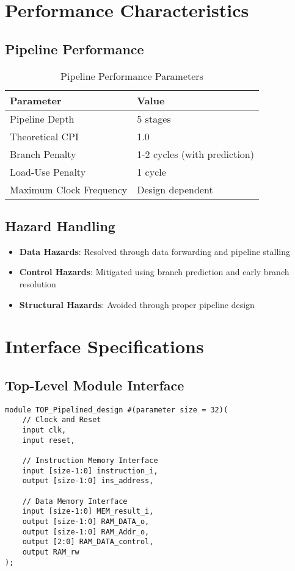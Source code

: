 \documentclass[11pt,a4paper]{article}
\begin{document}
\section{Performance Characteristics}

\subsection{Pipeline Performance}
\begin{table}[h]
\centering
\begin{tabular}{|l|l|}
\hline
\textbf{Parameter} & \textbf{Value} \\
\hline
Pipeline Depth & 5 stages \\
\hline
Theoretical CPI & 1.0 \\
\hline
Branch Penalty & 1-2 cycles (with prediction) \\
\hline
Load-Use Penalty & 1 cycle \\
\hline
Maximum Clock Frequency & Design dependent \\
\hline
\end{tabular}
\caption{Pipeline Performance Parameters}
\end{table}

\subsection{Hazard Handling}
\begin{itemize}
    \item \textbf{Data Hazards}: Resolved through data forwarding and pipeline stalling
    \item \textbf{Control Hazards}: Mitigated using branch prediction and early branch resolution
    \item \textbf{Structural Hazards}: Avoided through proper pipeline design
\end{itemize}

\section{Interface Specifications}

\subsection{Top-Level Module Interface}

\begin{lstlisting}[caption=TOP\_Pipelined\_design Module Interface]
module TOP_Pipelined_design #(parameter size = 32)(
    // Clock and Reset
    input clk,
    input reset,
    
    // Instruction Memory Interface
    input [size-1:0] instruction_i,
    output [size-1:0] ins_address,
    
    // Data Memory Interface
    input [size-1:0] MEM_result_i,
    output [size-1:0] RAM_DATA_o,
    output [size-1:0] RAM_Addr_o,
    output [2:0] RAM_DATA_control,
    output RAM_rw
);
\end{lstlisting}
\end{document}
